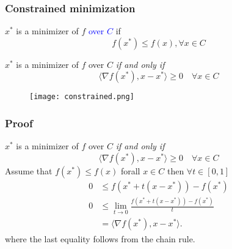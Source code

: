 \documentclass{beamer}
\begin{document}
\begin{frame}
  \frametitle{Constrained minimization}

  \begin{minipage}{0.5\textwidth}
    \begin{definition}
      $x^*$ is a minimizer of $f$ \textcolor{blue}{over $C$} if
      \begin{equation}
        f(x^*) \le f(x), \forall x \in C
      \end{equation}
    \end{definition}
    \begin{lemma}%
      $x^*$ is a minimizer of $f$ over $C$ \emph{if and only if}
      \begin{equation}
        \langle \nabla f(x^*), x-x^* \rangle \ge 0 \quad \forall x \in C
      \end{equation}
    \end{lemma}
  \end{minipage}
  \hfill
  \begin{minipage}{0.45\textwidth}
  \begin{figure}[ht]
    \centering
    \texttt{[image: constrained.png]}
  \end{figure}
  \end{minipage}
\end{frame}

\begin{frame}
  \frametitle{Proof}
  $x^*$ is a minimizer of $f$ over $C$ \emph{if and only if}
  \begin{equation}
    \langle \nabla f(x^*), x-x^* \rangle \ge 0 \quad \forall x \in C
  \end{equation}
  Assume that $f(x^*)\le f(x)$ forall $x \in C$ then $\forall t \in [0, 1]$
  \begin{equation}
    \begin{aligned}
      0 &\le f(x^* + t(x-x^*)) - f(x^*) \\
      0 &\le \lim_{t\to 0} \frac{f(x^* + t(x-x^*)) - f(x^*)}{t} \\
        &= \langle \nabla f(x^*), x-x^* \rangle.
    \end{aligned}
  \end{equation}
  where the last equality follows from the chain rule.

\end{frame}
\end{document}
